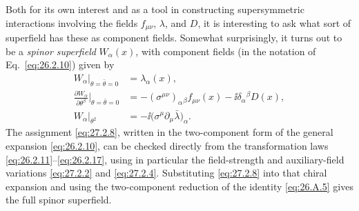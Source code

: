 Both for its own interest and as a tool in constructing supersymmetric
interactions involving the fields \(f_{\mu\nu}\), \(\lambda\), and \(D\),
it is interesting to ask what sort of superfield has these as component
fields. Somewhat surprisingly, it turns out to be a \textit{spinor
superfield} \(W_\alpha(x)\), with component fields (in the notation of
Eq.~\eqref{eq:26.2.10}) given by
\begin{equation}
  \begin{aligned}
  W_\alpha\big|_{\theta=\bar\theta=0}
    &=\lambda_\alpha(x),\\
  \frac{\partial W_\alpha}{\partial\theta^\beta}
    \bigg|_{\theta=\bar\theta=0}
    &=-(\sigma^{\mu\nu})_\alpha{}_\beta f_{\mu\nu}(x)
      -\ii\delta_\alpha{}^\beta D(x),\\
  W_\alpha\big|_{\theta^2}
    &=-\ii\bigl(\sigma^\mu\partial_\mu\bar\lambda\bigr)_\alpha .
  \end{aligned}
  \tag{27.2.8}\label{eq:27.2.8}
\end{equation}
The assignment \eqref{eq:27.2.8}, written in the two-component form of
the general expansion \eqref{eq:26.2.10}, can be checked directly from
the transformation laws \eqref{eq:26.2.11}--\eqref{eq:26.2.17}, using
in particular the field-strength and auxiliary-field variations
\eqref{eq:27.2.2} and \eqref{eq:27.2.4}.
Substituting \eqref{eq:27.2.8} into that chiral expansion and using the
two-component reduction of the identity \eqref{eq:26.A.5} gives the full
spinor superfield.

